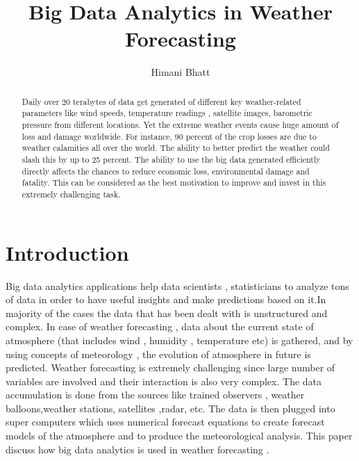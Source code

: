 \documentclass[sigconf]{acmart}
\begin{document}
\title{Big Data Analytics in Weather Forecasting}


\author{Himani Bhatt}



\renewcommand{\shortauthors}{H. Bhatt}



\begin{abstract}

Daily over 20 terabytes of data get generated  of different key weather-related parameters like wind speeds, temperature readings , satellite images, barometric pressure from different locations. Yet the extreme weather events cause huge amount of loss and damage worldwide. For instance, 90 percent of the crop losses are due to weather calamities all over the world. The ability to better predict the weather could slash this by up to 25 percent. The ability to use the big data generated efficiently directly affects the chances to reduce economic loss, environmental damage and fatality.  This can be considered as the best motivation to improve and invest in this extremely challenging task.

\end{abstract}


\maketitle

\section{Introduction} 

Big data analytics applications help data scientists , statisticians to analyze tons of data in order to have useful insights and make predictions based on it.In majority of the cases the data that has been dealt with is unstructured and complex. In case of weather forecasting , data about the current state of atmosphere (that includes wind , humidity , temperature etc) is gathered, and by using concepts of meteorology , the evolution of atmosphere in future is predicted. Weather forecasting is extremely challenging since large number of variables are involved and their interaction is also very complex.
The data accumulation is done from the sources like trained observers , weather balloons,weather stations, satellites ,radar, etc. The data is then plugged into super computers which uses numerical forecast equations to create forecast models of the atmosphere and to produce the meteorological analysis.
This paper discuss how big data analytics is used in weather forecasting \cite{Book01}.
\end{document}
